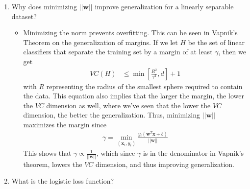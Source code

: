 \documentclass{article}
\newcommand{\Norm}[1]{\left|\left| #1\right|\right|}
\newcommand{\bx}{\mathbf{x}}
\newcommand{\bw}{\mathbf{w}}
\newcommand{\bwx}{\mathbf{w}^{T}\mathbf{x}}
\begin{document}
\begin{enumerate}
\begin{itemize}
\begin{align}
\end{align}
\item {\bf Logisitic Regression}: The function we want to minimize is:
\begin{align}
J(\mathbf{w}) &= \min_{\mathbf{w}}\left\{\frac{\mathbf{w}^{T}\mathbf{w}}{2\sigma^{2}} + \sum_{i}\log\left(1+\exp(-y_{i}\mathbf{w}^{T}\mathbf{x}_{i})\right)\right\}
\intertext{which unlike the SVM case {\em is} differentiable. We can remove the summation from this equation since we want to take the gradient of a single data point}
\frac{\partial J(\mathbf{w})}{\partial \mathbf{w}} &= \frac{\partial}{\partial \mathbf{w}} \left(\frac{\mathbf{w}^{T}\mathbf{w}}{2\sigma^{2}} + \log\left(1+\exp(-y\mathbf{w}^{T}\mathbf{x})\right)\right)\\
\frac{\partial J(\mathbf{w})}{\partial \mathbf{w}} &= \frac{\Norm{\mathbf{w}}}{\sigma^{2}}+\frac{-y\mathbf{x}}{1+\exp(y\mathbf{w}^{T}\mathbf{x})}
\end{align}
\end{itemize}


\item Why does minimizing $\Norm{\mathbf{w}}$ improve generalization for a linearly separable dataset?

\begin{itemize}
\item Minimizing the norm prevents overfitting. This can be seen in Vapnik's Theorem on the generalization of margins. If we let $H$ be the set of linear classifiers that separate the training set by a margin of at least $\gamma$, then we get
\begin{align}
VC(H) &\leq \min\left[\frac{R^{2}}{\gamma^{2}},d\right]+1
\end{align}
with $R$ representing the radius of the smallest sphere required to contain the data. This equation also implies that the larger the margin, the lower the $VC$ dimension as well, where we've seen that the lower the $VC$ dimension, the better the generalization. Thus, minimizing $\Norm{\bw}$ maximizes the margin since
\begin{align}
\gamma = \min_{(\bx_{i},y_{i})}\frac{y_{i}(\bwx+b)}{\Norm{\bw}}
\end{align}
This shows that $\gamma\propto\frac{1}{\Norm{\bw}}$, which since $\gamma$ is in the denominator in Vapnik's theorem, lowers the $VC$ dimension, and thus improving generalization.
\end{itemize}


\item What is the logistic loss function?


\end{enumerate}
\end{document}
